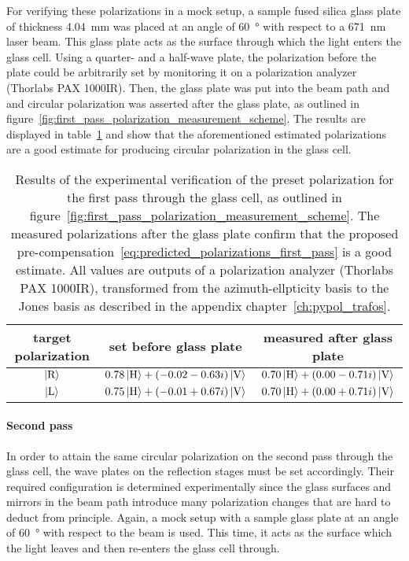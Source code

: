 For verifying these polarizations in a mock setup, a sample fused silica glass plate of thickness \SI{4.04}{\milli\meter} was placed at an angle of \SI{60}{\degree} with respect to a \SI{671}{\nano\meter} laser beam. This glass plate acts as the surface through which the light enters the glass cell. Using a quarter- and a half-wave plate, the polarization before the plate could be arbitrarily set by monitoring it on a polarization analyzer (Thorlabs PAX 1000IR). Then, the glass plate was put into the beam path and and circular polarization was asserted after the glass plate, as outlined in figure~\ref{fig:first_pass_polarization_measurement_scheme}. The results are displayed in table~\ref{tab:polarization_first_pass} and show that the aforementioned estimated polarizations  are a good estimate for producing circular polarization in the glass cell.

\begin{table}
    \centering
    \begin{tabular}{ccc}
        \toprule
        \textbf{target polarization} & \textbf{set before glass plate} & \textbf{measured after glass plate} \\
        \toprule
        $\Ket{\text{R}}$ & $0.78 \Ket{\text{H}} + (-0.02-0.63i) \Ket{\text{V}}$ & $0.70 \Ket{\text{H}} +(0.00-0.71i)\Ket{\text{V}}$ \\
        $\Ket{\text{L}}$ & $0.75 \Ket{\text{H}} + (-0.01+0.67i)\Ket{\text{V}}$ & $0.70 \Ket{\text{H}} + (0.00+0.71i)\Ket{\text{V}}$ \\
        \bottomrule
    \end{tabular}
    \caption{Results of the experimental verification of the preset polarization for the first pass through the glass cell, as outlined in figure~\ref{fig:first_pass_polarization_measurement_scheme}. The measured polarizations after the glass plate confirm that the proposed pre-compensation~\eqref{eq:predicted_polarizations_first_pass} is a good estimate. All values are outputs of a polarization analyzer (Thorlabs PAX 1000IR), transformed from the azimuth-ellpticity basis to the Jones basis as described in the appendix chapter~\ref{ch:pypol_trafos}.}
    \label{tab:polarization_first_pass}
\end{table}

\paragraph{Second pass}
In order to attain the same circular polarization on the second pass through the glass cell, the wave plates on the reflection stages must be set accordingly. Their required configuration is determined experimentally since the glass surfaces and mirrors in the beam path introduce many polarization changes that are hard to deduct from principle. Again, a mock setup with a sample glass plate at an angle of \SI[]{60}{\degree} with respect to the beam is used. This time, it acts as the surface which the light leaves and then re-enters the glass cell through.

